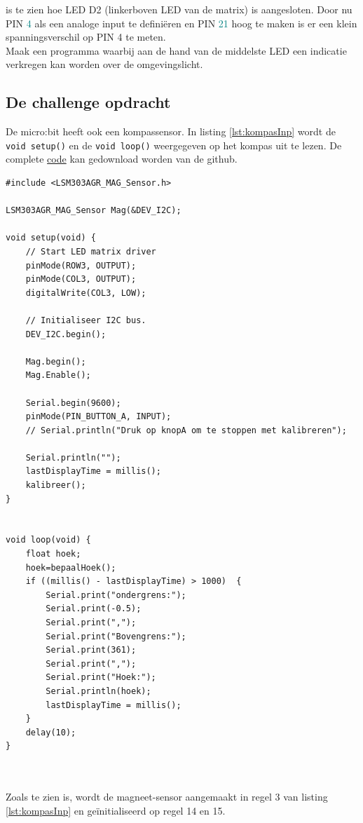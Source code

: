 \begin{enumerate}
\begin{figure}[h!]
	\end{figure}
	
	is te zien hoe LED D2 (linkerboven LED van de matrix) is aangesloten. Door nu PIN \textcolor{teal}{4} als een analoge input te definiëren en PIN \textcolor{teal}{21} hoog te maken is er een klein spanningsverschil op PIN 4 te meten.\\
	
    Maak een programma waarbij aan de hand van de middelste LED een indicatie verkregen kan worden over de omgevingslicht.
   
   \subsection{De challenge opdracht}
   
   De micro:bit heeft ook een kompassensor. In listing \ref{lst:kompasInp} wordt de \lstinline|void setup()| en de  \lstinline|void loop()| weergegeven op het kompas uit te lezen. De complete \href{https://github.com/JohnVi-hhs/embsysP/blob/main/voorbeelden/kompasOpdracht.ino}{code} kan gedownload worden van de github.
   	\begin{lstlisting}[caption= De micro:bit als een kompas,label={lst:kompasInp}]
#include <LSM303AGR_MAG_Sensor.h>

LSM303AGR_MAG_Sensor Mag(&DEV_I2C);
   		
void setup(void) {
	// Start LED matrix driver
	pinMode(ROW3, OUTPUT);
	pinMode(COL3, OUTPUT);
	digitalWrite(COL3, LOW);
	
	// Initialiseer I2C bus.
	DEV_I2C.begin();
	
	Mag.begin();
	Mag.Enable();
	
	Serial.begin(9600);
	pinMode(PIN_BUTTON_A, INPUT);
	// Serial.println("Druk op knopA om te stoppen met kalibreren");
	
	Serial.println("");
	lastDisplayTime = millis();
	kalibreer();
}

   		
void loop(void) {
	float hoek;
	hoek=bepaalHoek();
	if ((millis() - lastDisplayTime) > 1000)  {
		Serial.print("ondergrens:");
		Serial.print(-0.5);
		Serial.print(",");
		Serial.print("Bovengrens:");
		Serial.print(361);
		Serial.print(",");
		Serial.print("Hoek:");
		Serial.println(hoek);
		lastDisplayTime = millis();
	}
	delay(10);
}
   		
 
\end{lstlisting}
     
Zoals te zien is, wordt de magneet-sensor aangemaakt in regel 3 van listing \ref{lst:kompasInp} en geïnitialiseerd op regel 14 en 15.


\end{enumerate}
